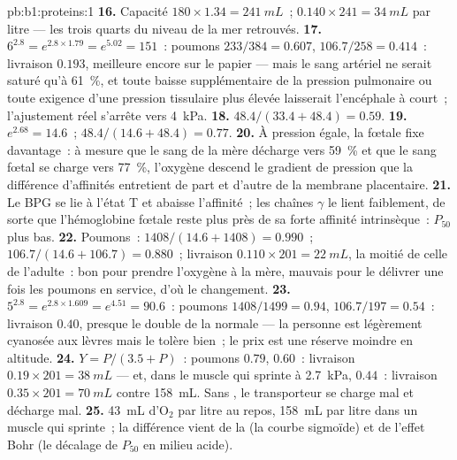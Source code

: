 \begin{solution}{pb:b1:proteins:1}
\textbf{16.} Capacité $180\times 1.34 = \qty{241}{mL}$~; $0.140\times
241 = \qty{34}{mL}$ par litre --- les trois quarts du niveau de la mer
retrouvés.
\textbf{17.} $6^{2.8} = e^{2.8\times 1.79} = e^{5.02} = 151$~: poumons
$233/384 = 0.607$,  $106.7/258 = 0.414$~: livraison $0.193$,
meilleure encore sur le papier --- mais le sang artériel ne serait
saturé qu'à \qty{61}{\%}, et toute baisse supplémentaire de la pression
pulmonaire ou toute exigence d'une pression tissulaire plus élevée
laisserait l'encéphale à court~; l'ajustement réel s'arrête vers
\qty{4}{kPa}.
\textbf{18.} $48.4/(33.4 + 48.4) = 0.59$.
\textbf{19.} $e^{2.68} = 14.6$~; $48.4/(14.6 + 48.4) = 0.77$.
\textbf{20.} À pression égale, la  fœtale fixe davantage~: à
mesure que le sang de la mère décharge vers \qty{59}{\%} et que le sang
fœtal se charge vers \qty{77}{\%}, l'oxygène descend le gradient de
pression que la différence d'affinités entretient de part et d'autre de
la membrane placentaire.
\textbf{21.} Le BPG se lie à l'état T et abaisse l'affinité~; les
chaînes $\gamma$ le lient faiblement, de sorte que l'hémoglobine fœtale
reste plus près de sa forte affinité intrinsèque~: $P_{50}$ plus bas.
\textbf{22.} Poumons~: $1408/(14.6 + 1408) = 0.990$~;  $106.7/(14.6
+ 106.7) = 0.880$~; livraison $0.110\times 201 = \qty{22}{mL}$, la
moitié de celle de l'adulte~: bon pour prendre l'oxygène à la mère,
mauvais pour le délivrer une fois les poumons en service, d'où le
changement.
\textbf{23.} $5^{2.8} = e^{2.8\times 1.609} = e^{4.51} = 90.6$~: poumons
$1408/1499 = 0.94$,  $106.7/197 = 0.54$~: livraison $0.40$, presque
le double de la normale --- la personne est légèrement cyanosée aux
lèvres mais le tolère bien~; le prix est une réserve moindre en
altitude.
\textbf{24.} $Y = P/(3.5 + P)$~: poumons $0.79$,  $0.60$~:
livraison $0.19\times 201 = \qty{38}{mL}$ --- et, dans le muscle qui
sprinte à \qty{2.7}{kPa}, $0.44$~: livraison $0.35\times 201 = \qty{70}{mL}$
contre \qty{158}{mL}. Sans , le transporteur se charge mal
et décharge mal.
\textbf{25.} \qty{43}{mL} d'$\mathrm{O_2}$ par litre au repos,
\qty{158}{mL} par litre dans un muscle qui sprinte~; la différence vient
de la  (la courbe sigmoïde) et de l'effet Bohr (le décalage
de $P_{50}$ en milieu acide).
\end{solution}
